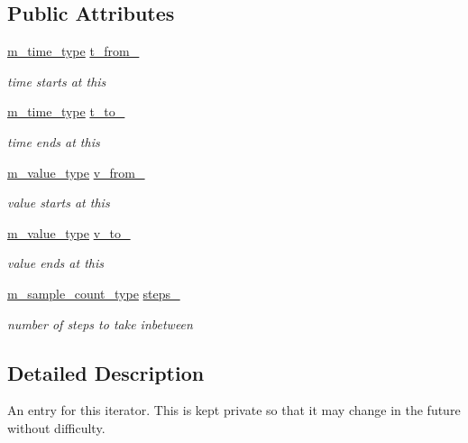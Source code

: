 \subsection*{Public Attributes}
\begin{CompactItemize}
\item 
\hyperlink{Types_8h_a2}{m\_\-time\_\-type} \hyperlink{classInterpolatorIterator_1_1Entry_o0}{t\_\-from\_\-}
\begin{CompactList}\small\item\em time starts at this \item\end{CompactList}\item 
\hyperlink{Types_8h_a2}{m\_\-time\_\-type} \hyperlink{classInterpolatorIterator_1_1Entry_o1}{t\_\-to\_\-}
\begin{CompactList}\small\item\em time ends at this \item\end{CompactList}\item 
\hyperlink{Types_8h_a3}{m\_\-value\_\-type} \hyperlink{classInterpolatorIterator_1_1Entry_o2}{v\_\-from\_\-}
\begin{CompactList}\small\item\em value starts at this \item\end{CompactList}\item 
\hyperlink{Types_8h_a3}{m\_\-value\_\-type} \hyperlink{classInterpolatorIterator_1_1Entry_o3}{v\_\-to\_\-}
\begin{CompactList}\small\item\em value ends at this \item\end{CompactList}\item 
\hyperlink{Types_8h_a1}{m\_\-sample\_\-count\_\-type} \hyperlink{classInterpolatorIterator_1_1Entry_o4}{steps\_\-}
\begin{CompactList}\small\item\em number of steps to take inbetween \item\end{CompactList}\end{CompactItemize}


\subsection{Detailed Description}
An entry for this iterator. This is kept private so that it may change in the future without difficulty. 




